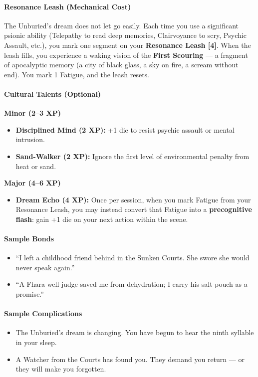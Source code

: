 \paragraph{Resonance Leash (Mechanical Cost)}
The Unburied's dream does not let go easily. Each time you use a significant psionic ability (Telepathy to read deep memories, Clairvoyance to scry, Psychic Assault, etc.), you mark one segment on your \textbf{Resonance Leash [4]}. When the leash fills, you experience a waking vision of the \textbf{First Scouring} --- a fragment of apocalyptic memory (a city of black glass, a sky on fire, a scream without end). You mark 1 Fatigue, and the leash resets.

\paragraph{Cultural Talents (Optional)}

\textbf{Minor (2--3 XP)}
\begin{itemize}
    \item \textbf{Disciplined Mind (2 XP):} +1 die to resist psychic assault or mental intrusion.
    \item \textbf{Sand-Walker (2 XP):} Ignore the first level of environmental penalty from heat or sand.
\end{itemize}

\textbf{Major (4--6 XP)}
\begin{itemize}
    \item \textbf{Dream Echo (4 XP):} Once per session, when you mark Fatigue from your Resonance Leash, you may instead convert that Fatigue into a \textbf{precognitive flash}: gain +1 die on your next action within the scene.
\end{itemize}

\paragraph{Sample Bonds}
\begin{itemize}
    \item ``I left a childhood friend behind in the Sunken Courts. She swore she would never speak again.''
    \item ``A Fhara well-judge saved me from dehydration; I carry his salt-pouch as a promise.''
\end{itemize}

\paragraph{Sample Complications}
\begin{itemize}
    \item The Unburied's dream is changing. You have begun to hear the ninth syllable in your sleep.
    \item A Watcher from the Courts has found you. They demand you return --- or they will make you forgotten.
\end{itemize}

